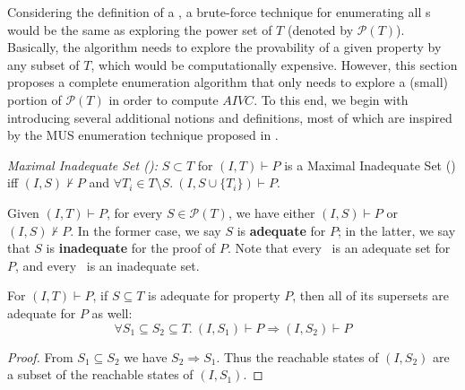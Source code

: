 

Considering the definition of a \mivc , a brute-force technique for enumerating all \mivc s would be the same as exploring the power set of $T$ (denoted by $ \mathcal{P}(T) $).
Basically, the algorithm needs to explore the provability of a
given property by any subset of $T$, which would be computationally expensive.
However, this section proposes a complete
enumeration algorithm that only needs to explore a (small) portion of $\mathcal{P}(T)$
in order to compute $AIVC$. To this end, we begin with introducing several additional notions and definitions, most of which are inspired by the MUS enumeration technique proposed in \cite{marco2016fast}.


\begin{definition}{\emph{Maximal Inadequate Set (\mis):}}
  \label{def:mis}
  $S \subset T$ for $(I, T) \vdash P$ is a Maximal Inadequate Set (\mis) iff
  $(I, S) \nvdash P$ and $\forall T_i \in T\setminus S.~ (I, S\cup\{T_i\}) \vdash P$.
\end{definition}

Given $(I, T) \vdash P$, for every $S \in \mathcal{P}(T)$, we have either $(I, S) \vdash P$ or $(I, S) \nvdash P$. In the former case, we say $S$ is \textbf{adequate} for $P$; in the latter, we say that $S$ is \textbf{inadequate} for the proof of $P$.
Note that every \ivc ~is an adequate set for $P$, and every \mis ~is an inadequate set.



\begin{lemma}
\label{lem:adeq}
For $(I, T) \vdash P$, if $S \subseteq T$ is adequate for property $P$, then all of its supersets are adequate for $P$ as well:
\allowbreak $$\forall S_1 \subseteq S_2 \subseteq T.~ (I, S_1) \vdash P \Rightarrow (I, S_2) \vdash P$$
\end{lemma}
\begin{proof}
From $S_1 \subseteq S_2$ we have $S_2 \Rightarrow S_1$. Thus the
  reachable states of $(I, S_2)$ are a subset of the reachable states
  of $(I, S_1)$.
\end{proof}

